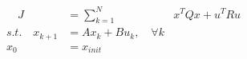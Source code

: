 \documentclass[preview]{standalone}
\begin{document}
\begin{align*}
\quad J &= \sum_{k=1}^N \; &x^TQx + u^T R u \\ s.t. \quad x_{k+1} &= Ax_k + Bu_k, \quad \forall k \\ x_0 &= x_{init}
\end{align*}
\end{document}
